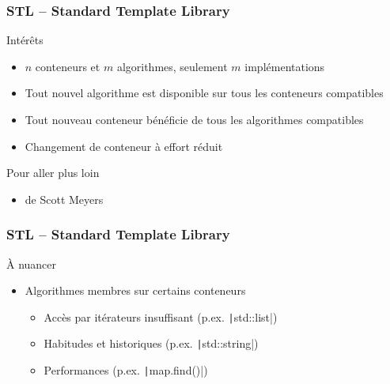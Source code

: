 \documentclass[C++.tex]{subfiles}
\begin{document}
\begin{frame}[fragile]
	\frametitle{STL -- Standard Template Library}
	\begin{block}{Intérêts}
		\begin{itemize}
			\item $n$ conteneurs et $m$ algorithmes, seulement $m$ implémentations
			\item Tout nouvel algorithme est disponible sur tous les conteneurs compatibles
			\item Tout nouveau conteneur bénéficie de tous les algorithmes compatibles
			\item Changement de conteneur à effort réduit
		\end{itemize}
	\end{block}

	\begin{block}{Pour aller plus loin}
		\begin{itemize}
			\item \cite{effStl} de Scott Meyers
		\end{itemize}
	\end{block}
\end{frame}

\begin{frame}[fragile]
	\frametitle{STL -- Standard Template Library}
	\begin{block}{À nuancer}
		\begin{itemize}
			\item Algorithmes membres sur certains conteneurs
			\begin{itemize}
				\item Accès par itérateurs insuffisant (p.ex. \texttt|std::list|)
				\item Habitudes et historiques (p.ex. \texttt|std::string|)
				\item Performances (p.ex. \texttt|map.find()|)
			\end{itemize}
		\end{itemize}
	\end{block}
\end{frame}
\end{document}
